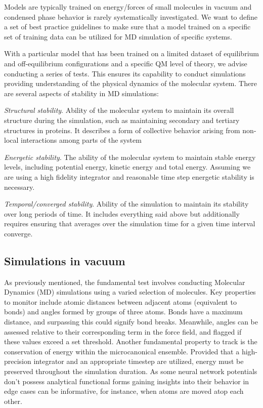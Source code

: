 \documentclass[9pt,bestpractices]{livecoms}
\begin{document}
Models are typically trained on energy/forces of small molecules in vacuum and
condensed phase behavior is rarely systematically investigated. We want to
define a set of best practice guidelines to make sure that a model trained on a
specific set of training data can be utilized for MD simulation of specific
systems.

With a particular model that has been trained on a
limited dataset of equilibrium and off-equilibrium configurations and a specific
QM level of theory, we advise conducting a series of tests. This ensures its
capability to conduct simulations providing understanding of the physical
dynamics of the molecular system.  There are several aspects of stability in MD
simulations: 

\textit{Structural stability}. Ability of the molecular system to maintain
its overall structure during the simulation, such as maintaining secondary and
tertiary structures in proteins. It describes a form of collective behavior
arising from non-local interactions among parts of the system 

\textit{Energetic stability}. The ability of the molecular system to maintain stable energy levels,
including potential energy, kinetic energy and total energy. Assuming we are
using a high fidelity integrator and reasonable time step energetic stability is
necessary.  

\textit{Temporal/converged stability}. Ability of the simulation to maintain
its stability over long periods of time. It includes everything said above but
additionally requires ensuring that averages over the simulation time for a
given time interval converge.

\subsection{Simulations in vacuum}

As previously mentioned, the fundamental test involves conducting Molecular
Dynamics (MD) simulations using a varied selection of molecules. Key properties
to monitor include atomic distances between adjacent atoms (equivalent to bonds)
and angles formed by groups of three atoms. Bonds have a maximum distance, and
surpassing this could signify bond breaks. Meanwhile, angles can be assessed
relative to their corresponding term in the force field, and flagged if these
values exceed a set threshold.  Another fundamental property to track is the
conservation of energy within the microcanonical ensemble. Provided that a
high-precision integrator and an appropriate timestep are utilized, energy must
be preserved throughout the simulation duration.  As some neural network potentials don't possess
analytical functional forms gaining insights into their behavior in edge cases
can be informative, for instance, when atoms are moved atop each other.
\end{document}
